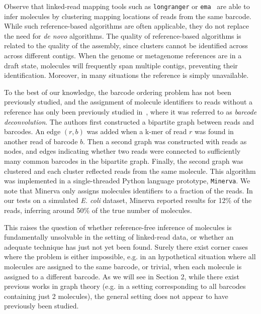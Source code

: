 \documentclass[a4paper,UKenglish,cleveref, autoref, thm-restate,authorcolumns]{lipics-v2019}
\begin{document}
Observe that linked-read mapping tools such as \texttt{longranger} or \texttt{ema}~\cite{ema} are able to infer molecules by clustering mapping locations of reads from the same barcode. 
While such reference-based algorithms are often applicable, they do not replace the need for \emph{de novo} algorithms. The quality of reference-based algorithms is related to the quality of the assembly, since clusters cannot be identified across across different contigs. When the genome or metagenome references are in a draft state, molecules will frequently span multiple contigs, preventing their identification. Moreover, in many situations the reference is simply unavailable.

To the best of our knowledge, the barcode ordering problem has not been previously studied, and the assignment of molecule identifiers to reads without a reference has only been previously studied in~\cite{minerva}, where it was referred to as
\emph{barcode deconvolution}. The authors first constructed a bipartite graph between reads and barcodes. An edge $(r, b)$ was added when a k-mer of read $r$ was found in another read of barcode $b$. Then a second graph was constructed with reads as nodes, and edges indicating whether two reads were connected to sufficiently many common barcodes in the bipartite graph. Finally, the second graph was clustered and each cluster reflected reads from the same molecule. This algorithm was implemented in a single-threaded Python language prototype, \texttt{Minerva}. We note that Minerva only assigns molecules identifiers to a fraction of the reads. In our tests on a simulated \emph{E. coli} dataset, Minerva reported results for 12\% of the reads, inferring around 50\% of the true number of molecules.

This raises the question of whether reference-free inference of molecules is fundamentally unsolvable in the setting of linked-read data, or whether an adequate technique has just not yet been found. Surely there exist corner cases where the problem is either impossible, e.g. in an hypothetical situation where all molecules are assigned to the same barcode, or trivial, when each molecule is assigned to a different barcode. As we will see in Section 2, while there exist previous works in graph theory (e.g. in a setting corresponding to all barcodes containing just 2 molecules), the general setting does not appear to have previously been studied.

\end{document}
